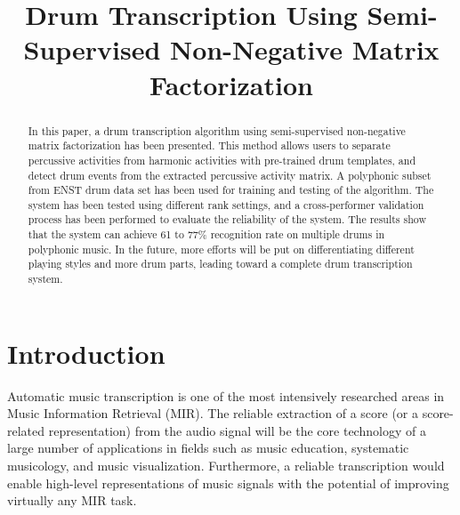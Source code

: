 \documentclass{article}
\title{Drum Transcription Using Semi-Supervised Non-Negative Matrix Factorization}
\begin{document}
%
\maketitle
%
\begin{abstract}
In this paper, a drum transcription algorithm using semi-supervised non-negative matrix factorization has been presented. This method allows users to separate percussive activities from harmonic activities with pre-trained drum templates, and detect drum events from the extracted percussive activity matrix. A polyphonic subset from ENST drum data set has been used for training and testing of the algorithm. The system has been tested using different rank settings, and a cross-performer validation process has been performed to evaluate the reliability of the system.  The results show that the system can achieve 61 to 77\% recognition rate on multiple drums in polyphonic music. In the future, more efforts will be put on differentiating different playing styles and more drum parts, leading toward a complete drum transcription system.

\end{abstract}
%

\section{Introduction}\label{sec:introduction}
Automatic music transcription is one of the most intensively researched areas in Music Information Retrieval (MIR). The reliable extraction of a score (or a score-related representation) from the audio signal will be the core technology of a large number of applications in fields such as music education, systematic musicology, and music visualization. Furthermore, a reliable transcription would enable high-level representations of music signals with the potential of improving virtually any MIR task.

\end{document}
